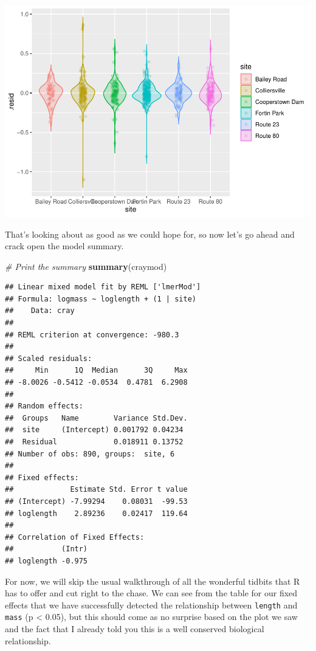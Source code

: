 \documentclass[
]{book}
\newenvironment{Shaded}{\begin{snugshade}}{\end{snugshade}}
\newcommand{\CommentTok}[1]{\textcolor[rgb]{0.56,0.35,0.01}{\textit{#1}}}
\newcommand{\KeywordTok}[1]{\textcolor[rgb]{0.13,0.29,0.53}{\textbf{#1}}}
\newcommand{\NormalTok}[1]{#1}
\begin{document}
\includegraphics{worstr_files/figure-latex/unnamed-chunk-378-1.pdf}

That's looking about as good as we could hope for, so now let's go ahead and crack open the model summary.

\begin{Shaded}
\begin{Highlighting}[]
\CommentTok{# Print the summary}
\KeywordTok{summary}\NormalTok{(craymod)}
\end{Highlighting}
\end{Shaded}

\begin{verbatim}
## Linear mixed model fit by REML ['lmerMod']
## Formula: logmass ~ loglength + (1 | site)
##    Data: cray
## 
## REML criterion at convergence: -980.3
## 
## Scaled residuals: 
##     Min      1Q  Median      3Q     Max 
## -8.0026 -0.5412 -0.0534  0.4781  6.2908 
## 
## Random effects:
##  Groups   Name        Variance Std.Dev.
##  site     (Intercept) 0.001792 0.04234 
##  Residual             0.018911 0.13752 
## Number of obs: 890, groups:  site, 6
## 
## Fixed effects:
##             Estimate Std. Error t value
## (Intercept) -7.99294    0.08031  -99.53
## loglength    2.89236    0.02417  119.64
## 
## Correlation of Fixed Effects:
##           (Intr)
## loglength -0.975
\end{verbatim}

For now, we will skip the usual walkthrough of all the wonderful tidbits that R has to offer and cut right to the chase. We can see from the table for our fixed effects that we have successfully detected the relationship between \texttt{length} and \texttt{mass} (p \textless{} 0.05), but this should come as no surprise based on the plot we saw and the fact that I already told you this is a well conserved biological relationship.
\end{document}
